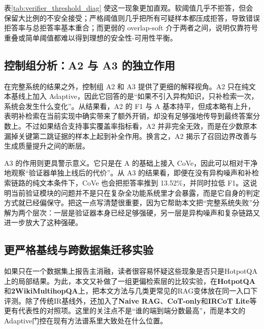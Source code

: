 表\ref{tab:verifier_threshold_diag} 使这一现象更加直观。软阈值几乎不拒答，但会保留大比例的不安全接受；严格阈值则几乎把所有可疑样本都压成拒答，导致错误拒答率与总拒答率基本重合；而更弱的 overlap-soft 介于两者之间，说明仅靠符号重叠或简单阈值都难以得到理想的安全性-可用性平衡。

\subsection{控制组分析：A2 与 A3 的独立作用}

在完整系统的结果之外，控制组 A2 和 A3 提供了更细的解释视角。A2 只在纯文本基线上加入 Adaptive，因此它回答的是“如果不引入异构知识，只补检索一次，系统会发生什么变化”。从结果看，A2 的 F1 与 A 基本持平，但成本略有上升，表明补检索在当前实现中确实带来了额外开销，却没有足够强地传导到最终答案分数上。不过如果结合支持事实覆盖率指标看，A2 并非完全无效，而是在少数原本漏掉关键第二跳证据的样本上起到补全作用。换言之，A2 揭示了召回边界改善与生成质量提升之间的断层。

A3 的作用则更具警示意义。它只是在 A 的基础上接入 CoVe，因此可以相对干净地观察“验证器单独上线后的代价”。从 A3 的结果看，即便在没有异构噪声和补检索链路的纯文本条件下，CoVe 也会把拒答率推到 13.52\%，并同时拉低 F1。这说明当前验证模块的问题并不是只在复杂全功能系统里才会暴露，而是它自身的判定方式就已经偏保守。把这一点写清楚很重要，因为它帮助本文把“完整系统失败”分解为两个层次：一层是验证器本身已经足够强硬，另一层是异构噪声和复杂链路又进一步放大了这种强硬。

\subsection{更严格基线与跨数据集迁移实验}
\vspace{-0.3\baselineskip}

如果只在一个数据集上报告主消融，读者很容易怀疑这些现象是否只是HotpotQA上的局部结果。为此，本文又补做了一组更偏检索层的比较实验，在\textbf{HotpotQA}和\textbf{2WikiMultihopQA}上，把本文方法与几类更常见的RAG变体放在同一入口下评测。除了传统IR基线外，还加入了\textbf{Naive RAG}、\textbf{CoT-only}和\textbf{IRCoT Lite}等更有代表性的对照项。这里的关注点不是“谁的端到端分数最高”，而是本文的Adaptive门控在现有方法谱系里大致处在什么位置。

